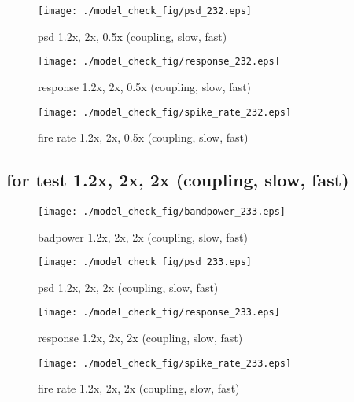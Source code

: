 \documentclass[11pt]{article}
\begin{document}
\begin{figure}[htbp]
\begin{center}
\texttt{[image: ./model\_check\_fig/psd\_232.eps]}
\caption{psd 1.2x, 2x, 0.5x (coupling, slow, fast)}
\end{center}
\end{figure}

\begin{figure}[htbp]
\begin{center}
\texttt{[image: ./model\_check\_fig/response\_232.eps]}
\caption{response 1.2x, 2x, 0.5x (coupling, slow, fast)}
\end{center}
\end{figure}

\begin{figure}[htbp]
\begin{center}
\texttt{[image: ./model\_check\_fig/spike\_rate\_232.eps]}
\caption{fire rate 1.2x, 2x, 0.5x (coupling, slow, fast)}
\end{center}
\end{figure}


\subsection{for test 1.2x, 2x, 2x (coupling, slow, fast)}
\label{sec:org233}

\begin{figure}[htbp]
\centering
\texttt{[image: ./model\_check\_fig/bandpower\_233.eps]}
\caption{badpower 1.2x, 2x, 2x (coupling, slow, fast)}
\end{figure}

\begin{figure}[htbp]
\begin{center}
\texttt{[image: ./model\_check\_fig/psd\_233.eps]}
\caption{psd 1.2x, 2x, 2x (coupling, slow, fast)}
\end{center}
\end{figure}

\begin{figure}[htbp]
\begin{center}
\texttt{[image: ./model\_check\_fig/response\_233.eps]}
\caption{response 1.2x, 2x, 2x (coupling, slow, fast)}
\end{center}
\end{figure}

\begin{figure}[htbp]
\begin{center}
\texttt{[image: ./model\_check\_fig/spike\_rate\_233.eps]}
\caption{fire rate 1.2x, 2x, 2x (coupling, slow, fast)}
\end{center}
\end{figure}
\end{document}
